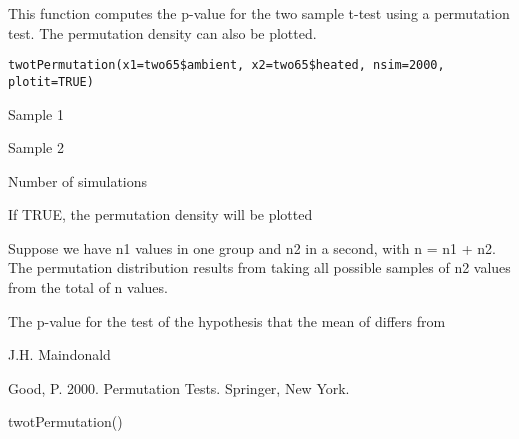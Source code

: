 \begin{Description}\relax
This function computes the p-value for the two sample
t-test using a permutation test.  The permutation density
can  also be plotted.
\end{Description}
\begin{Usage}
\begin{verbatim}
twotPermutation(x1=two65$ambient, x2=two65$heated, nsim=2000, plotit=TRUE)
\end{verbatim}
\end{Usage}
\begin{Arguments}
\begin{ldescription}
\item[\code{x1}] Sample 1
\item[\code{x2}] Sample 2
\item[\code{nsim}] Number of simulations
\item[\code{plotit}] If TRUE, the permutation density will be plotted
\end{ldescription}
\end{Arguments}
\begin{Details}\relax
Suppose we have n1 values in one group and n2 in a
second, with n = n1 + n2. The permutation distribution
results from taking all possible samples of n2 values from
the total of n values.
\end{Details}
\begin{Value}
The p-value for the test of the hypothesis that the mean of
 differs from 
\end{Value}
\begin{Author}\relax
J.H. Maindonald
\end{Author}
\begin{References}\relax
Good, P. 2000. Permutation Tests. Springer, New York.
\end{References}
\begin{Examples}
\begin{ExampleCode}
twotPermutation()
\end{ExampleCode}
\end{Examples}

